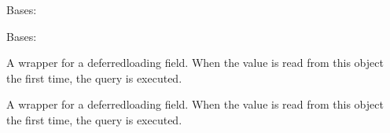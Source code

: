 \documentclass[letterpaper,10pt,english]{sphinxmanual}
\begin{document}
\begin{fulllineitems}
\begin{fulllineitems}
\end{fulllineitems}


\begin{fulllineitems}
\label{\detokenize{courses:courses.models.Lesson.DoesNotExist}}
\pysigstartsignatures
\pysigline
{}
\pysigstopsignatures
\sphinxAtStartPar
Bases: 

\end{fulllineitems}


\begin{fulllineitems}
\label{\detokenize{courses:courses.models.Lesson.MultipleObjectsReturned}}
\pysigstartsignatures
\pysigline
{}
\pysigstopsignatures
\sphinxAtStartPar
Bases: 

\end{fulllineitems}


\begin{fulllineitems}
\label{\detokenize{courses:id4}}
\pysigstartsignatures
\pysigline
{}
\pysigstopsignatures
\sphinxAtStartPar
A wrapper for a deferred\sphinxhyphen{}loading field. When the value is read from this
object the first time, the query is executed.

\end{fulllineitems}


\begin{fulllineitems}
\label{\detokenize{courses:courses.models.Lesson.created_at}}
\pysigstartsignatures
\pysigline
{}
\pysigstopsignatures
\sphinxAtStartPar
A wrapper for a deferred\sphinxhyphen{}loading field. When the value is read from this
object the first time, the query is executed.


\end{fulllineitems}
\end{fulllineitems}
\end{document}
